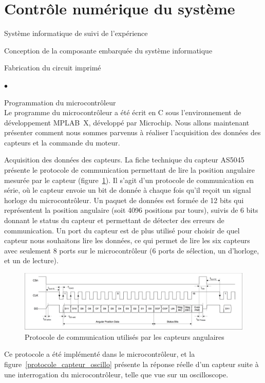 \documentclass[a4paper,twoside,12pt]{article}
\newcounter{partie}
\newcounter{sous-partie}
\newenvironment{partie}[1]
{
\section{#1}
}
{

}
\newenvironment{sous-partie}[1]
{
\subsection{#1}
}
{

}
\newenvironment{sous-sous-partie}[1]
{
\subsubsection{#1}
}
{

}
\newenvironment{liste}
{
\vspace{0.2cm}
\begin{list}{$\bullet$\hspace{0.3cm}}{\leftmargin=1.4cm}
}
{
\end{list}
\vspace{0.2cm}
}
\begin{document}
\begin{partie}{Contrôle numérique du système}
\begin{sous-partie}{Système informatique de suivi de l'expérience}
\begin{sous-sous-partie}{Conception de la composante embarquée du système informatique}
\begin{paragraph}{Fabrication du circuit imprimé\vspace{0.3cm}\\}
\begin{liste}
\end{liste}
\end{paragraph}

\begin{paragraph}{Programmation du microcontrôleur\vspace{0.3cm}\\}
Le programme du microcontrôleur a été écrit en C sous l'environnement de développement MPLAB~X, développé par Microchip. %
Nous allons maintenant présenter comment nous sommes parvenus à réaliser l'acquisition des données des capteurs et la commande du moteur.

\begin{subparagraph}{Acquisition des données des capteurs.}
La fiche technique du capteur AS5045 présente le protocole de communication permettant de lire la position angulaire mesurée par le capteur (figure~\ref{protocole_capteur}). %
Il s'agit d'un protocole de communication en série, où le capteur envoie un bit de donnée à chaque fois qu'il reçoit un signal horloge du microcontrôleur. %
Un paquet de données est formée de 12 bits qui représentent la position angulaire (soit 4096 positions par tours), suivis de 6 bits donnant le status du capteur et permettant de détecter des erreurs de communication. %
Un port du capteur est de plus utilisé pour choisir de quel capteur nous souhaitons lire les données, ce qui permet de lire les six capteurs avec seulement 8 ports sur le microcontrôleur (6 ports de sélection, un d'horloge, et un de lecture).

\begin{figure}[!h]
	\centering
	\includegraphics[width=\textwidth]{./images/protocole_capteur.png}
	\caption{Protocole de communication utilisés par les capteurs angulaires}
	\label{protocole_capteur}
\end{figure}

Ce protocole a été implémenté dans le microcontrôleur, et la figure~\ref{protocole_capteur_oscillo} présente la réponse réelle d'un capteur suite à une interrogation du microcontrôleur, telle que vue sur un oscilloscope.


\end{subparagraph}
\end{paragraph}
\end{sous-sous-partie}
\end{sous-partie}
\end{partie}
\end{document}
